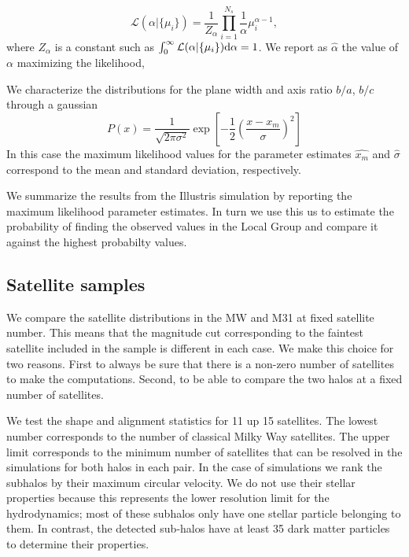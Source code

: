 \documentclass[a4paper,fleqn,usenatbib]{mnras}
\begin{document}
\begin{equation}
\mathcal{L}(\alpha|\{\mu_i\})=\frac{1}{Z_\alpha}\prod_{i=1}^{N_s}
\frac{1}{\alpha}\mu_i^{\alpha-1}, 
\end{equation}
%
where $Z_{\alpha}$ is a constant such as $\int_{0}^{\infty}
{\mathcal L}(\alpha|\{\mu_i\}) {\rm d}\alpha=1$. 
We report as $\hat{\alpha}$ the value of $\alpha$ 
maximizing the likelihood,

We characterize the distributions for the plane width and axis ratio
$b/a$, $b/c$ through a gaussian
\begin{equation}
P(x)  = \frac{1}{\sqrt{2\pi \sigma^2}} \exp{\left[-\frac{1}{2}\left(\frac{x-x_m}{\sigma}\right)^2\right]}
\end{equation}
In this case the maximum likelihood values for the parameter estimates
$\hat{x_m}$ and $\hat{\sigma}$ correspond to the mean and standard
deviation, respectively.

We summarize the results from the Illustris simulation by reporting
the maximum likelihood parameter estimates. 
In turn we use this us to estimate the probability of finding the
observed values in the Local Group and compare it against the highest
probabilty values.


\subsection{Satellite samples}

We compare the satellite distributions in the MW and M31 at fixed
satellite number.
This means that the magnitude cut corresponding to the faintest
satellite included in the sample is different in each case.
We make this choice for two reasons. 
First to always be sure that there is a non-zero number of satellites to make the computations. 
Second, to be able to compare the two halos at a fixed number of
satellites. 

We test the shape and alignment statistics for 11 up 15 satellites.
The lowest number corresponds to the number of classical Milky Way
satellites.
The upper limit corresponds to the minimum number of satellites that
can be resolved in the simulations for both halos in each pair. 
In the case of simulations we rank the subhalos by their maximum
circular velocity. 
We do not use their stellar properties because this represents the
lower resolution limit for the hydrodynamics; most of these subhalos
only have one stellar particle belonging to them. 
In contrast, the detected sub-halos have at least 35 dark matter
particles to determine their properties.
\end{document}

